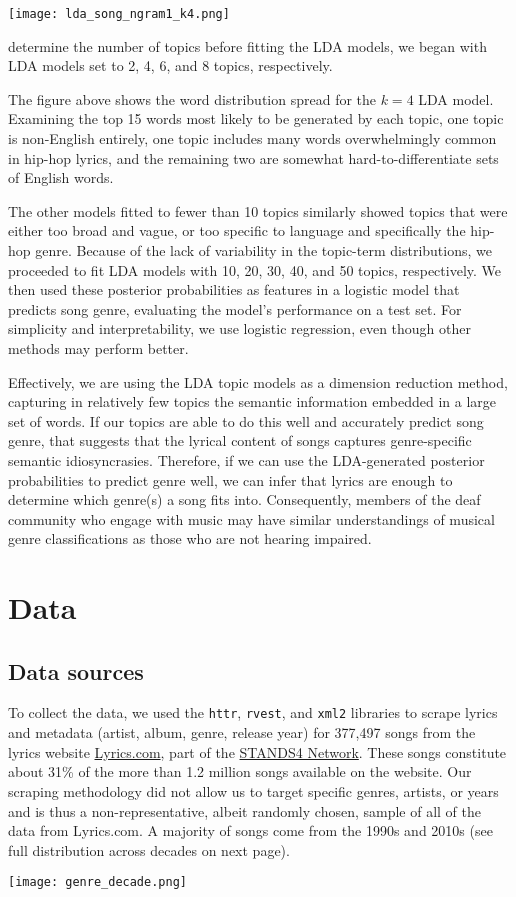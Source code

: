\documentclass[12pt, titlepage]{article}
\begin{document}
\begin{center}
    \texttt{[image: lda\_song\_ngram1\_k4.png]}
\end{center}

\noindent determine the number of topics before fitting the LDA models, we began with LDA models set to 2, 4, 6, and 8 topics, respectively. 

The figure above shows the word distribution spread for the $k=4$ LDA model. Examining the top 15 words most likely to be generated by each topic, one topic is non-English entirely, one topic includes many words overwhelmingly common in hip-hop lyrics, and the remaining two are somewhat hard-to-differentiate sets of English words.

The other models fitted to fewer than 10 topics similarly showed topics that were either too broad and vague, or too specific to language and specifically the hip-hop genre. Because of the lack of variability in the topic-term distributions, we proceeded to fit LDA models with 10, 20, 30, 40, and 50 topics, respectively. We then used these posterior probabilities as features in a logistic model that predicts song genre, evaluating the model's performance on a test set. For simplicity and interpretability, we use logistic regression, even though other methods may perform better.

Effectively, we are using the LDA topic models as a dimension reduction method, capturing in relatively few topics the semantic information embedded in a large set of words. If our topics are able to do this well and accurately predict song genre, that suggests that the lyrical content of songs captures genre-specific semantic idiosyncrasies. Therefore, if we can use the LDA-generated posterior probabilities to predict genre well, we can infer that lyrics are enough to determine which genre(s) a song fits into. Consequently, members of the deaf community who engage with music may have similar understandings of musical genre classifications as those who are not hearing impaired.

\section{Data}
\subsection{Data sources}
To collect the data, we used the \texttt{httr}, \texttt{rvest}, and \texttt{xml2} libraries to scrape lyrics and metadata (artist, album, genre, release year) for 377,497 songs from the lyrics website \href{https://www.lyrics.com/}{Lyrics.com}, part of the \href{https://www.lyrics.com/about.php}{STANDS4 Network}. These songs constitute about 31\% of the more than 1.2 million songs available on the website. Our scraping methodology did not allow us to target specific genres, artists, or years and is thus a non-representative, albeit randomly chosen, sample of all of the data from Lyrics.com. A majority of songs come from the 1990s and 2010s (see full distribution across decades on next page). 
\begin{center}
\texttt{[image: genre\_decade.png]}
\end{center}
\end{document}
